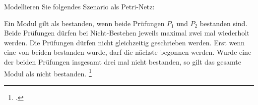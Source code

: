 \documentclass{bschlangaul-aufgabe}
\begin{document}

Modellieren Sie folgendes Szenario als Petri-Netz:

\bigskip

\noindent
Ein Modul gilt als bestanden, wenn beide Prüfungen $P_1$ und $P_2$
bestanden sind. Beide Prüfungen dürfen bei Nicht-Bestehen jeweils
maximal zwei mal wiederholt werden. Die Prüfungen dürfen nicht
gleichzeitig geschrieben werden. Erst wenn eine von beiden bestanden
wurde, darf die nächste begonnen werden. Wurde eine der beiden Prüfungen
insgesamt drei mal nicht bestanden, so gilt das gesamte Modul als nicht
bestanden.
\footcite[Seite 2]{sosy:ab:4}
\end{document}

